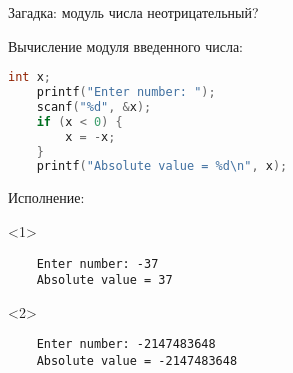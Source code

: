 \begin{frame}[fragile]{Загадка: модуль числа неотрицательный?}

  \begin{block}{Вычисление модуля введенного числа:}
    \begin{lstlisting}[language=C]
    int x;
    printf("Enter number: ");
    scanf("%d", &x);
    if (x < 0) {
        x = -x;
    }
    printf("Absolute value = %d\n", x);
    \end{lstlisting}
  \end{block}

  \begin{block}{Исполнение:}
    \begin{onlyenv}<1>\begin{lstlisting}
    Enter number: -37
    Absolute value = 37
    \end{lstlisting}\end{onlyenv}
    \begin{onlyenv}<2>\begin{lstlisting}
    Enter number: -2147483648
    Absolute value = -2147483648
    \end{lstlisting}\end{onlyenv}
  \end{block}

\end{frame}

